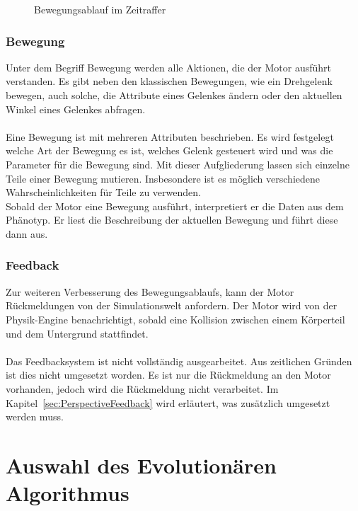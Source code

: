 \begin{figure}[H]
        \caption{Bewegungsablauf im Zeitraffer\label{fig:ConceptMovement}}

      \end{figure}

    \subsubsection{Bewegung\label{subsub:EngineMovement}}

      Unter dem Begriff Bewegung werden alle Aktionen, die der Motor ausführt verstanden.
      Es gibt neben den klassischen Bewegungen, wie ein Drehgelenk bewegen,
      auch solche, die Attribute eines Gelenkes ändern oder den aktuellen Winkel eines Gelenkes abfragen.
      \\
      \\
      Eine Bewegung ist mit mehreren Attributen beschrieben.
      Es wird festgelegt welche Art der Bewegung es ist,
      welches Gelenk gesteuert wird und was die Parameter für die Bewegung sind.
      Mit dieser Aufgliederung lassen sich einzelne Teile einer Bewegung mutieren.
      Insbesondere ist es möglich verschiedene Wahrscheinlichkeiten für Teile zu verwenden.
      \\
      Sobald der Motor eine Bewegung ausführt, interpretiert er die Daten aus dem Phänotyp.
      Er liest die Beschreibung der aktuellen Bewegung und führt diese dann aus.

    \subsubsection{Feedback}

      Zur weiteren Verbesserung des Bewegungsablaufs,
      kann der Motor Rückmeldungen von der Simulationswelt anfordern.
      Der Motor wird von der Physik-Engine benachrichtigt,
      sobald eine Kollision zwischen einem Körperteil und dem Untergrund stattfindet.
      \\
      \\
      Das Feedbacksystem ist nicht vollständig ausgearbeitet.
      Aus zeitlichen Gründen ist dies nicht umgesetzt worden.
      Es ist nur die Rückmeldung an den Motor vorhanden, jedoch wird die Rückmeldung nicht verarbeitet.
      Im Kapitel~\vref{sec:PerspectiveFeedback} wird erläutert, was zusätzlich umgesetzt werden muss.

  \section{Auswahl des Evolutionären Algorithmus}


